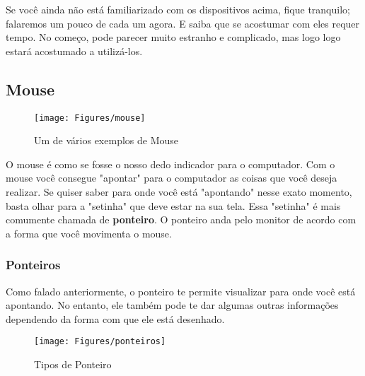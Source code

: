 \documentclass[hidelinks,12pt]{article}
\begin{document}
Se você ainda não está familiarizado com os dispositivos acima, fique tranquilo; falaremos um pouco de cada um agora. E saiba que se acostumar com eles requer tempo. No começo, pode parecer muito estranho e complicado, mas logo logo estará acostumado a utilizá-los.

\subsection{Mouse}

\begin{figure}[!h]
	\centering
	\texttt{[image: Figures/mouse]}
	\caption{Um de vários exemplos de Mouse}
	\label{fig:mouse}
\end{figure}

O mouse é como se fosse o nosso dedo indicador para o computador. Com o mouse você consegue "apontar" para o computador as coisas que você deseja realizar. Se quiser saber para onde você está "apontando" nesse exato momento, basta olhar para a "setinha" que deve estar na sua tela. Essa "setinha" é mais comumente chamada de \textbf{ponteiro}. O ponteiro anda pelo monitor de acordo com a forma que você movimenta o mouse. 

\subsubsection{Ponteiros}

Como falado anteriormente, o ponteiro te permite visualizar para onde você está apontando. No entanto, ele também pode te dar algumas outras informações dependendo da forma com que ele está desenhado.


\begin{figure}[!h]
	\centering
	\texttt{[image: Figures/ponteiros]}
	\caption{Tipos de Ponteiro}
	\label{fig:ponteiros}
\end{figure}
\end{document}
